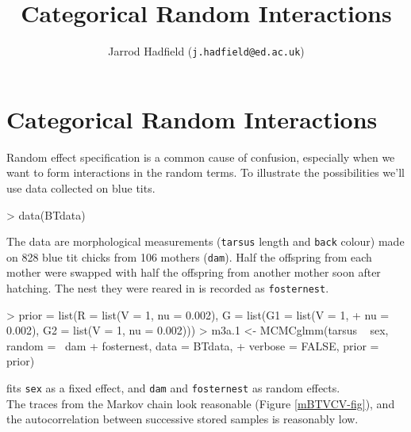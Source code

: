 \documentclass{article}
\title{Categorical Random Interactions}
\author{Jarrod Hadfield (\texttt{j.hadfield@ed.ac.uk})}
\begin{document}
\maketitle
\else
\chapter{Categorical Random Interactions}
\label{chap3}
\fi



Random effect specification is a common cause of confusion, especially when we want to form interactions in the random terms. To illustrate the possibilities we'll use data collected on blue tits.

\begin{Schunk}
\begin{Sinput}
> data(BTdata)
\end{Sinput}
\end{Schunk}

The data are morphological measurements (\texttt{tarsus} length and \texttt{back} colour) made on 828 blue tit chicks from 106 mothers (\texttt{dam}). Half the offspring from each mother were swapped with half the offspring from another mother soon after hatching. The nest they were reared in is recorded as \texttt{fosternest}.  

\begin{Schunk}
\begin{Sinput}
> prior = list(R = list(V = 1, nu = 0.002), G = list(G1 = list(V = 1, 
+     nu = 0.002), G2 = list(V = 1, nu = 0.002)))
> m3a.1 <- MCMCglmm(tarsus ~ sex, random = ~dam + fosternest, data = BTdata, 
+     verbose = FALSE, prior = prior)
\end{Sinput}
\end{Schunk}

fits \texttt{sex} as a fixed effect, and \texttt{dam} and \texttt{fosternest} as random effects.\\  

The traces from the Markov chain look reasonable (Figure \ref{mBTVCV-fig}), and the autocorrelation between successive stored samples is reasonably low. 
\end{document}
